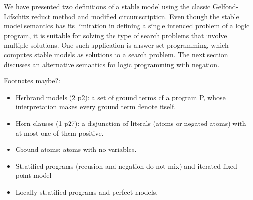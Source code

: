 We have presented two definitions of a stable model using the classic Gelfond-Lifschitz reduct method 
and modified circumscription. Even though the stable model semantics has its limitation in 
defining a single intended problem of a logic program, it is suitable for solving 
the type of search problems that involve multiple solutions. One such application is answer 
set programming, which computes stable models as solutions to a search problem. The next 
section discusses an alternative semantics for logic programming with negation.

Footnotes maybe?: 
\begin{itemize}
    \item Herbrand models (2 p2): a set of ground terms of a program P, whose interpretation 
    makes every ground term denote itself.
    \item Horn clauses (1 p27): a disjunction of literals (atoms or negated atoms) with at most one of 
    them positive.
    \item Ground atoms: atoms with no variables.
    \item Stratified programs (recusion and negation do not mix) and iterated fixed point model 
    \item Locally stratified programs and perfect models.
\end{itemize}